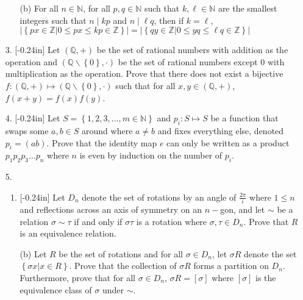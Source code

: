 \documentclass[letterpaper,12pt]{article}
\newcommand{\set}[1]{\left\{ #1 \right\}}
\theoremstyle{definition}
\begin{document}
\pagebreak
\begin{enumerate}
    \item[] \begin{enumerate}
        \item[(b)] For all $n \in \mathbb{N}$, for all $p,q \in \mathbb{N}$ such that $k,\ell \in \mathbb{N}$ are the smallest integers such that $n \mid kp$ and $n \mid \ell q$, then if $k = \ell$, $|\set{ px \in \mathbb{Z} | 0 \leq px \leq kp \in \mathbb{Z}}| = |\set{ qy \in \mathbb{Z} | 0 \leq y q \leq \ell q \in \mathbb{Z}}|$
    \end{enumerate}
\end{enumerate}
\pagebreak
\begin{enumerate}
    \item[3. ]\reversemarginpar{}[-0.24in] Let $(\mathbb{Q},+)$ be the set of rational numbers with addition as the operation and $(\mathbb{Q}\backslash \set{0},\cdot)$ be the set of rational numbers except 0 with multiplication as the operation. Prove that there does not exist a bijective $f: (\mathbb{Q},+) \mapsto (\mathbb{Q}\backslash \set{0},\cdot)$ such that for all $x,y \in (\mathbb{Q},+)$, $f(x+y) = f(x)f(y)$.
\end{enumerate}
\pagebreak
\begin{enumerate}
    \item[4.]\reversemarginpar{}[-0.24in] Let $S = \set{1,2,3,\ldots,m \in \mathbb{N}}$ and $p_i:S \mapsto S$ be a function that swaps some $a,b \in S$ around where $a \neq b$ and fixes everything else, denoted $p_i = (ab)$. Prove that the identity map $e$ can only be written as a product $p_1p_2p_3\ldots p_n$ where $n$ is even by induction on the number of $p_i$.
\end{enumerate}
\pagebreak
\begin{enumerate}
    \item[5.]  \begin{enumerate}
    \item \reversemarginpar{}[-0.24in] 
Let $D_n$ denote the set of rotations by an angle of $\frac{2\pi}{i}$ where $1 \leq n$ and reflections across an axis of symmetry on an $n-$gon, and let $\sim$ be a relation $\sigma \sim \tau$ if and only if $\sigma \tau$ is a rotation where $\sigma, \tau \in D_n$. Prove that $R$ is an equivalence relation.
\end{enumerate}
\end{enumerate}
\pagebreak
\begin{enumerate}
    \item[] \begin{enumerate}
        \item[(b)] Let $R$ be the set of rotations and for all $\sigma \in D_n$, let $\sigma R$ denote the set $\set{\sigma x | x \in R}$. Prove that the collection of $\sigma R$ forms a partition on $D_n$. Furthermore, prove that for all $\sigma \in D_n$, $\sigma R = [\sigma]$ where $[\sigma]$ is the equivalence class of $\sigma$ under $\sim$.
    \end{enumerate}
\end{enumerate}
\end{document}
